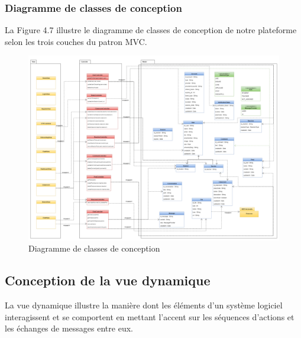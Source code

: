 \subsubsection{Diagramme de classes de conception}
La Figure 4.7 illustre le diagramme de classes de conception de notre plateforme selon les trois couches du patron MVC.
\begin{figure}[H]
    \centering
    \includegraphics[width=1.5\textwidth,height=1.12\textwidth,angle=90]{images/chp4/fig7.png}
    \caption{Diagramme de classes de conception }
    \label{fig:Diagramme de classes selon le patron MVC}    
\end{figure}

\subsection{Conception de la vue dynamique}
La vue dynamique illustre la manière dont les éléments d'un système logiciel interagissent et se comportent en mettant l'accent sur les séquences d'actions et les échanges de messages entre eux.

